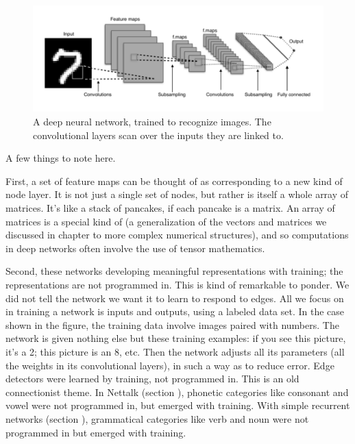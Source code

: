 \begin{figure}[h]
\centering
\includegraphics[scale=.45]{./images/deepNet.png}
\caption[Adapted from a creative commons image by Aphex34 at \url{https://commons.wikimedia.org/wiki/File:Typical_cnn.png} ]{A deep neural network, trained to recognize images. The convolutional layers scan over the inputs they are linked to. }
\label{deep_net2}
\end{figure}

A few things to note here.

First, a set of feature maps can be thought of as corresponding to a new kind of node layer. It is not just a  single set of nodes, but rather is itself a whole array of matrices. It's like a stack of pancakes, if each pancake is a matrix.  An array of matrices is a special kind of  (a generalization of the vectors and matrices we discussed in chapter  to more complex numerical structures), and so computations in deep networks often involve the use of tensor mathematics.

Second, these networks developing meaningful representations with training; the representations are not programmed in. This is kind of remarkable to ponder. We did not tell the network we want it to learn to respond to edges. All we focus on in training a network is inputs and outputs, using a labeled data set.  In the case shown in the figure, the training data involve images paired with numbers. The network is given nothing else but these training examples: if you see this picture, it's a 2; this picture is an 8, etc. Then the network adjusts all its parameters (all the weights in its convolutional layers), in such a way as to reduce error.  Edge detectors were learned by training, not programmed in. This is an old connectionist theme. In Nettalk (section ), phonetic categories like consonant and vowel were not programmed in, but emerged with training. With simple recurrent networks  (section ), grammatical categories like verb and noun were not programmed in but  emerged with training.


